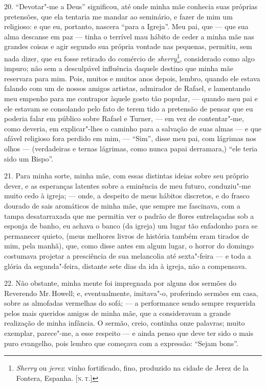 20. ``Devotar"-me a Deus'' significou, até onde minha mãe conhecia suas
próprias pretensões, que ela tentaria me mandar ao seminário, e fazer de
mim um religioso: e que eu, portanto, nascera ``para a Igreja''. Meu
pai, que --- que sua alma descanse em paz --- tinha o terrível mau hábito
de ceder a minha mãe nas grandes coisas e agir segundo sua própria
vontade nas pequenas, permitiu, sem nada dizer, que eu fosse retirado do
comércio de \emph{sherry}\footnote{\emph{Sherry} ou \emph{jerez}: vinho
  fortificado, fino, produzido na cidade de Jerez de la Fontera, Espanha.
  {[}\textsc{n.\,t.}{]}}, considerado como algo impuro; não sem a
desculpável influência daquele destino que minha mãe reservara para mim.
Pois, muitos e muitos anos depois, lembro, quando ele estava falando com
um de nossos amigos artistas, admirador de Rafael, e lamentando meu
empenho para me contrapor àquele gosto tão popular, --- quando meu pai e
ele estavam se consolando pelo fato de terem tido a pretensão de pensar
que eu poderia falar em público sobre Rafael e Turner, --- em vez de
contentar"-me, como deveria, em explicar"-lhes o caminho para a salvação
de suas almas --- e que afável religioso fora perdido em mim, --- ``Sim'',
disse meu pai, com lágrimas nos olhos --- (verdadeiras e ternas lágrimas,
como nunca papai derramara,) ``ele teria sido um Bispo''.

21. Para minha sorte, minha mãe, com essas distintas ideias sobre seu
próprio dever, e as esperanças latentes sobre a eminência de meu futuro,
conduziu"-me muito cedo à igreja; --- onde, a despeito de meus hábitos
discretos, e do frasco dourado de sais aromáticos de minha mãe, que
sempre me fascinava, com a tampa desatarraxada que me permitia ver o
padrão de flores entrelaçadas sob a esponja de banho, eu achava o banco
(da igreja) um lugar tão enfadonho para se permanecer quieto, (meus
melhores livros de história também eram tirados de mim, pela manhã),
que, como disse antes em algum lugar, o horror do domingo costumava
projetar a presciência de sua melancolia até sexta"-feira --- e toda a
glória da segunda"-feira, distante sete dias da ida à igreja, não a
compensava.

22. Não obstante, minha mente foi impregnada por alguns dos sermões do
Reverendo Mr.\,Howell; e, eventualmente, imitava"-o, proferindo sermões em
casa, sobre as almofadas vermelhas do sofá; --- a performance sendo sempre
requerida pelos mais queridos amigos de minha mãe, que a consideravam a
grande realização de minha infância. O sermão, creio, continha onze
palavras; muito exemplar, parece"-me, a esse respeito --- e ainda penso
que deve ter sido o mais puro evangelho, pois lembro que começava com a
expressão: ``Sejam bons''.

